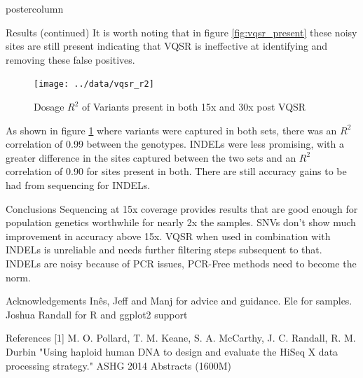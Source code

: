 \documentclass[final,xcolor=table]{beamer}
\begin{document}
\begin{frame}{}
\begin{columns}[t]
\begin{column}{.49\textwidth}
\begin{beamercolorbox}[center,wd=\textwidth]{postercolumn}
\begin{minipage}[T]{.95\textwidth}
\begin{block}{Results (continued)}
                {It is worth noting that in figure \ref{fig:vqsr_present} these noisy sites are still present indicating that VQSR is ineffective at identifying and removing these false positives.}

                \begin{figure}
                \texttt{[image: ../data/vqsr\_r2]}
                \caption{Dosage $R^2$ of Variants present in both 15x and 30x post VQSR}
                \label{fig:r2}
                \end{figure}

                As shown in figure \ref{fig:r2} where variants were captured in both sets, there was an $R^2$ correlation of 0.99 between the genotypes. INDELs were less promising, with a greater difference in the sites captured between the two sets and an $R^2$ correlation of 0.90 for sites present in both. There are still accuracy gains to be had from sequencing for INDELs.

            \end{block}
            \begin{block}{Conclusions}
                Sequencing at 15x coverage provides results that are good enough for population genetics worthwhile for nearly 2x the samples. SNVs don't show much improvement in accuracy above 15x. VQSR when used in combination with INDELs is unreliable and needs further filtering steps subsequent to that. INDELs are noisy because of PCR issues, PCR-Free methods need to become the norm.
            \end{block}
            \begin{block}{Acknowledgements}
                Inês, Jeff and Manj for advice and guidance. Ele for samples. Joshua Randall for R and ggplot2 support
            \end{block}
            \begin{block}{References}
                [1] M. O. Pollard, T. M. Keane, S. A. McCarthy, J. C. Randall, R. M. Durbin "Using haploid human DNA to design and evaluate the HiSeq X data processing strategy." ASHG 2014 Abstracts (1600M)

            \end{block}
            \vfill


            \end{minipage}
        \end{beamercolorbox}
    \end{column}
    \end{columns}

\end{frame}
\end{document}
